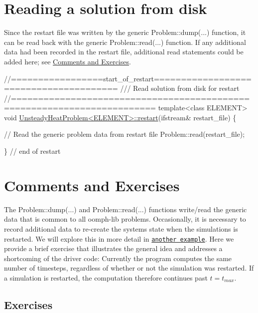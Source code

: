  

\hypertarget{index_read}{}\section{Reading a solution from disk}\label{index_read}
Since the restart file was written by the generic {\ttfamily Problem\+::dump}(...) function, it can be read back with the generic {\ttfamily Problem\+::read}(...) function. If any additional data had been recorded in the restart file, additional read statements could be added here; see \hyperlink{index_comments}{Comments and Exercises}.


\begin{DoxyCodeInclude}
\textcolor{comment}{//=================start\_of\_restart=======================================}
\textcolor{comment}{/// Read solution from disk for restart}
\textcolor{comment}{}\textcolor{comment}{//========================================================================}
\textcolor{keyword}{template}<\textcolor{keyword}{class} ELEMENT>
\textcolor{keywordtype}{void} \hyperlink{classUnsteadyHeatProblem_ad0a4a1c1da24f6d62f64b0d40be31709}{UnsteadyHeatProblem<ELEMENT>::restart}(ifstream& restart\_file)
\{

 \textcolor{comment}{// Read the generic problem data from restart file}
 Problem::read(restart\_file);

\} \textcolor{comment}{// end of restart}

\end{DoxyCodeInclude}




 

\hypertarget{index_comments}{}\section{Comments and Exercises}\label{index_comments}
The {\ttfamily Problem\+::dump}(...) and {\ttfamily Problem\+::read}(...) functions write/read the generic data that is common to all {\ttfamily oomph-\/lib} problems. Occasionally, it is necessary to record additional data to re-\/create the system\textquotesingle{}s state when the simulations is restarted. We will explore this in more detail in \href{../../two_d_unsteady_heat_2adapt/html/index.html}{\tt another example}. Here we provide a brief exercise that illustrates the general idea and addresses a shortcoming of the driver code\+: Currently the program computes the same number of timesteps, regardless of whether or not the simulation was restarted. If a simulation is restarted, the computation therefore continues past $ t=t_{max}. $\hypertarget{index_exercises}{}\subsection{Exercises}\label{index_exercises}

